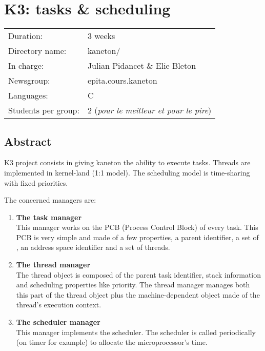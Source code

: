 
%
%

\chapter{K3: tasks \& scheduling}

%
%

\begin{tabular}{p{7cm}l}
Duration: & 3 weeks \\
Directory name: & kaneton/ \\
In charge: & Julian Pidancet \& Elie Bleton\\
Newsgroup: & epita.cours.kaneton \\
Languages: & C \\
Students per group: & 2 (\textit{pour le meilleur et pour le pire}) \\
\end{tabular}

\section{Abstract}

K3 project consists in giving kaneton the ability to execute
tasks. Threads are implemented in kernel-land (1:1 model). The
scheduling model is time-sharing with fixed priorities.

The concerned managers are:

\begin{enumerate}
  \item
    {\bf The task manager}\\
    This manager works on the PCB (Process Control Block) of every
    task. This PCB is very simple and made of a few properties, a
    parent identifier, a set of , an address space identifier
    and a set of threads.
  \item
    {\bf The thread manager}\\
    The thread object is composed of the parent task identifier, stack
    information and scheduling properties like priority. The thread
    manager manages both this part of the thread object plus the
    machine-dependent object made of the thread's execution context.
  \item
    {\bf The scheduler manager}\\ This manager implements the
    scheduler. The scheduler is called periodically (on timer for
    example) to allocate the microprocessor's time.
\end{enumerate}

